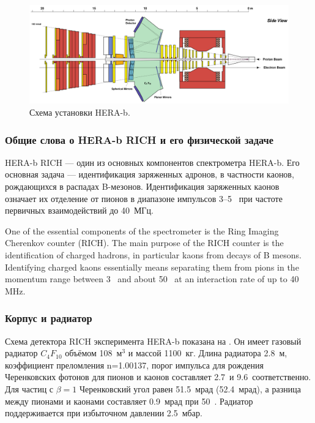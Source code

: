 \begin{figure}[H]
\centering
\includegraphics[width=1.0\textwidth]{pictures/HERA_b_setup.png}
\caption{Схема установки HERA-b.}
\label{fig:HERAbSetup}
\end{figure}

\subsubsection{Общие слова о HERA-b RICH и его физической задаче}

HERA-b RICH --- один из основных компонентов спектрометра HERA-b. Его основная задача --- идентификация заряженных адронов, в частности каонов, рождающихся в распадах B-мезонов. Идентификация заряженных каонов означает их отделение от пионов в диапазоне импульсов 3--5~\GeVoverC{} при частоте первичных взаимодействий до 40~МГц.

One of the essential components of the spectrometer is the Ring Imaging Cherenkov counter (RICH). The main purpose of the RICH counter is the identification of charged hadrons, in particular kaons from decays of B mesons. Identifying charged kaons essentially means separating them from pions in the momentum range between 3~\GeVoverC{} and about 50~\GeVoverC{} at an interaction rate of up to 40 MHz.

\subsubsection{Корпус и радиатор}

Схема детектора RICH эксперимента HERA-b показана на . Он имеет газовый радиатор $C_{4}F_{10}$ объёмом 108~м$^3$ и массой 1100~кг. Длина радиатора 2.8~м, коэффициент преломления n=1.00137, порог импульса для рождения Черенковских фотонов для пионов и каонов составляет 2.7~\GeVoverC и 9.6~\GeVoverC соответственно. Для частиц с $\beta=1$ Черенковский угол равен 51.5~мрад (52.4~мрад), а разница между пионами и каонами составляет 0.9~мрад при 50~\GeVoverC. Радиатор поддерживается при избыточном давлении 2.5~мбар.

